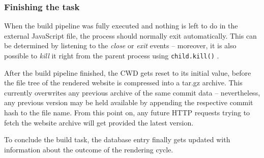 \subsubsection{Finishing the task}
When the build pipeline was fully executed and nothing is left to do in the external JavaScript file, the process should normally exit automatically. This can be determined by listening to the \emph{close} or \emph{exit} events -- moreover, it is also possible to \emph{kill} it right from the parent process using \texttt{child.kill()} \cite{NodejsKillProcess}.

After the build pipeline finished, the CWD gets reset to its initial value, before the file tree of the rendered website is compressed into a tar.gz archive. This currently overwrites any previous archive of the same commit data -- nevertheless, any previous version may be held available by appending the respective commit hash to the file name. From this point on, any future HTTP requests trying to fetch the website archive will get provided the latest version.

To conclude the build task, the database entry finally gets updated with information about the outcome of the rendering cycle.
